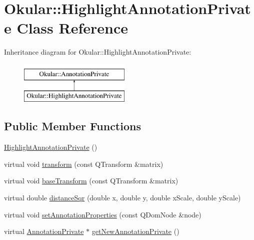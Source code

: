 \hypertarget{classOkular_1_1HighlightAnnotationPrivate}{\section{Okular\+:\+:Highlight\+Annotation\+Private Class Reference}
\label{classOkular_1_1HighlightAnnotationPrivate}
}
Inheritance diagram for Okular\+:\+:Highlight\+Annotation\+Private\+:\begin{figure}[H]
\begin{center}
\leavevmode
\includegraphics[height=2.000000cm]{classOkular_1_1HighlightAnnotationPrivate}
\end{center}
\end{figure}
\subsection*{Public Member Functions}
\begin{DoxyCompactItemize}
\item 
\hyperlink{classOkular_1_1HighlightAnnotationPrivate_a48de29138e8bde908f4ead60c32219e7}{Highlight\+Annotation\+Private} ()
\item 
virtual void \hyperlink{classOkular_1_1HighlightAnnotationPrivate_a3b4f24f4078952bcaf75bf1e9411d581}{transform} (const Q\+Transform \&matrix)
\item 
virtual void \hyperlink{classOkular_1_1HighlightAnnotationPrivate_a9e9b792f43a4a1f050af1018d3118e32}{base\+Transform} (const Q\+Transform \&matrix)
\item 
virtual double \hyperlink{classOkular_1_1HighlightAnnotationPrivate_a8285cfe8a18e00cd14eb2dee6972d800}{distance\+Sqr} (double x, double y, double x\+Scale, double y\+Scale)
\item 
virtual void \hyperlink{classOkular_1_1HighlightAnnotationPrivate_a325cad498885cdeb23efc48b10e35587}{set\+Annotation\+Properties} (const Q\+Dom\+Node \&node)
\item 
virtual \hyperlink{classOkular_1_1AnnotationPrivate}{Annotation\+Private} $\ast$ \hyperlink{classOkular_1_1HighlightAnnotationPrivate_a9b7c4c00430f696265e49ecad9c69f14}{get\+New\+Annotation\+Private} ()
\end{DoxyCompactItemize}
